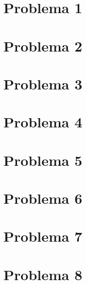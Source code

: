 \documentclass{article}
\theoremstyle{theorem-style}  %
\theoremstyle{definition-style}
\theoremstyle{example-style}
\begin{document}
\makeatletter\renewcommand{\ALG@name}{Algoritmo}

\maketitle




\section*{Problema 1}

\newpage
\section*{Problema 2}

\newpage
\section*{Problema 3}

\newpage
\section*{Problema 4}

\newpage
\section*{Problema 5}

\newpage
\section*{Problema 6}

\newpage
\section*{Problema 7}

\newpage
\section*{Problema 8}
\end{document}
